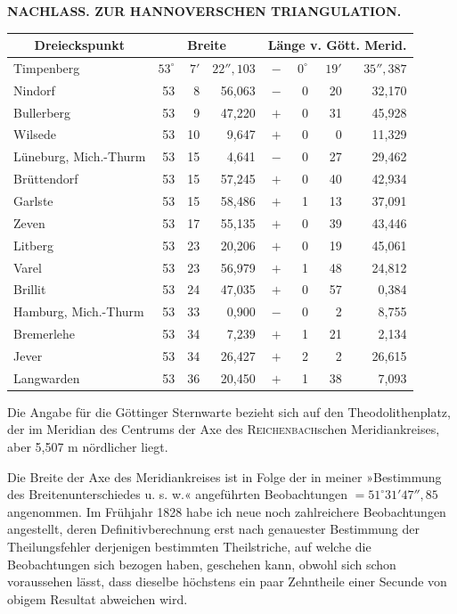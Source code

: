 \par\clearpage
\noindent{}\hfill{\small\textbf{NACHLASS. ZUR HANNOVERSCHEN TRIANGULATION.}}\hfill\null\par\medskip
\begin{center}
\begingroup\setlength{\tabcolsep}{4pt}\renewcommand{\arraystretch}{1.25}
\begin{tabular}{|l|rrr|rrrr|}
\hline
\multicolumn{1}{|c|}{Dreieckspunkt}&\multicolumn{3}{c|}{Breite}&\multicolumn{4}{c|}{Länge v. Gött. Merid.}\\\hline
Timpenberg&$53^\circ$&$7'$&$22''{,}103$&$-$&$0^\circ$&$19'$&$35''{,}387$\\
Nindorf&53&8&56,063&$-$&0&20&32,170\\
Bullerberg&53&9&47,220&$+$&0&31&45,928\\
Wilsede&53&10&9,647&$+$&0&0&11,329\\
Lüneburg, Mich.-Thurm&53&15&4,641&$-$&0&27&29,462\\
Brüttendorf&53&15&57,245&$+$&0&40&42,934\\
Garlste&53&15&58,486&$+$&1&13&37,091\\
Zeven&53&17&55,135&$+$&0&39&43,446\\
Litberg&53&23&20,206&$+$&0&19&45,061\\
Varel&53&23&56,979&$+$&1&48&24,812\\
Brillit&53&24&47,035&$+$&0&57&0,384\\
Hamburg, Mich.-Thurm&53&33&0,900&$-$&0&2&8,755\\
Bremerlehe&53&34&7,239&$+$&1&21&2,134\\
Jever&53&34&26,427&$+$&2&2&26,615\\
Langwarden&53&36&20,450&$+$&1&38&7,093\\
\end{tabular}\endgroup
\end{center}
\par\noindent\hspace*{\parindent}Die Angabe für die Göttinger Sternwarte bezieht sich auf den Theodolithenplatz, der im Meridian des Centrums der Axe des \textsc{Reichenbach}schen Meridiankreises, aber 5,507 m nördlicher liegt.

\par\noindent\hspace*{\parindent}Die Breite der Axe des Meridiankreises ist in Folge der in meiner »Bestimmung des Breitenunterschiedes u. s. w.« angeführten Beobachtungen $=51^\circ31'47''{,}85$ angenommen. Im Frühjahr 1828 habe ich neue noch zahlreichere Beobachtungen angestellt, deren Definitivberechnung erst nach genauester Bestimmung der Theilungsfehler derjenigen bestimmten Theilstriche, auf welche die Beobachtungen sich bezogen haben, geschehen kann, obwohl sich schon voraussehen lässt, dass dieselbe höchstens ein paar Zehntheile einer Secunde von obigem Resultat abweichen wird.

